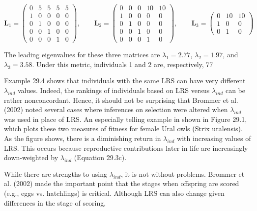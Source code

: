 \documentclass{article}
\begin{document}
\begin{equation}
\mathbf{L}_{1}=\begin{pmatrix}{{{0}}}&{{{5}}}&{{{5}}}&{{{5}}}&{{{5}}} \\{{{1}}}&{{{0}}}&{{{0}}}&{{{0}}}&{{{0}}} \\{{{0}}}&{{{1}}}&{{{0}}}&{{{0}}}&{{{0}}} \\{{{0}}}&{{{0}}}&{{{1}}}&{{{0}}}&{{{0}}} \\{{{0}}}&{{{0}}}&{{{0}}}&{{{1}}}&{{{0}}}\end{pmatrix},\qquad\mathbf{L}_{2}=\begin{pmatrix}{{{0}}}&{{{0}}}&{{{0}}}&{{{10}}}&{{{10}}} \\{{{1}}}&{{{0}}}&{{{0}}}&{{{0}}}&{{{0}}} \\{{{0}}}&{{{1}}}&{{{0}}}&{{{0}}}&{{{0}}} \\{{{0}}}&{{{0}}}&{{{1}}}&{{{0}}}&{{{0}}} \\{{{0}}}&{{{0}}}&{{{0}}}&{{{1}}}&{{{0}}}\end{pmatrix},\qquad\mathbf{L}_{3}=\begin{pmatrix}{{{0}}}&{{{10}}}&{{{10}}} \\{{{1}}}&{{{0}}}&{{{0}}} \\{{{0}}}&{{{1}}}&{{{0}}}\end{pmatrix}
\end{equation}

The leading eigenvalues for these three matrices are  $ \lambda_1 = 2.77 $,  $ \lambda_2 = 1.97 $, and  $ \lambda_3 = 3.58 $. Under this metric, individuals 1 and 2 are, respectively, 77%

Example 29.4 shows that individuals with the same LRS can have very different  $ \lambda_{ind} $ values. Indeed, the rankings of individuals based on LRS versus  $ \lambda_{ind} $ can be rather nonconcordant. Hence, it should not be surprising that Brommer et al. (2002) noted several cases where inferences on selection were altered when  $ \lambda_{ind} $ was used in place of LRS. An especially telling example in shown in Figure 29.1, which plots these two measures of fitness for female Ural owls (Strix uralensis). As the figure shows, there is a diminishing return in  $ \lambda_{ind} $ with increasing values of LRS. This occurs because reproductive contributions later in life are increasingly down-weighted by  $ \lambda_{ind} $ (Equation 29.3c).

While there are strengths to using  $ \lambda_{ind} $, it is not without problems. Brommer et al. (2002) made the important point that the stages when offspring are scored (e.g., eggs vs. hatchlings) is critical. Although LRS can also change given differences in the stage of scoring,
\end{document}
